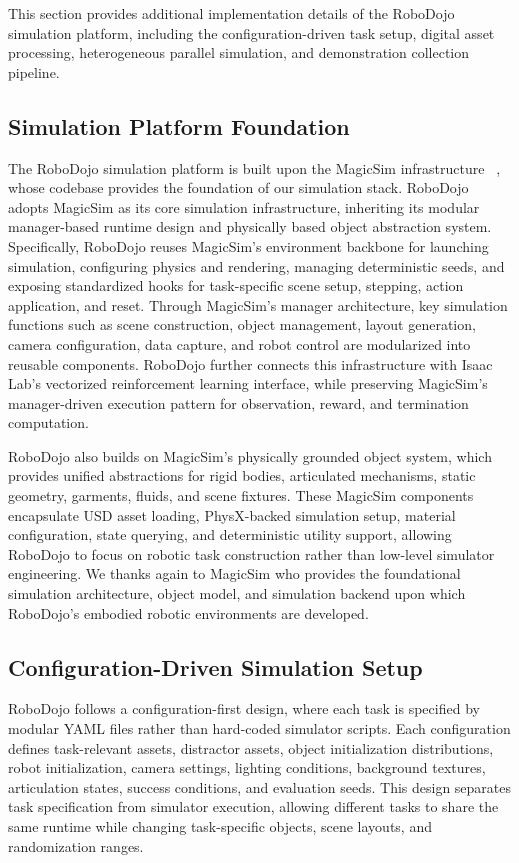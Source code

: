 This section provides additional implementation details of the RoboDojo simulation platform, including the configuration-driven task setup, digital asset processing, heterogeneous parallel simulation, and demonstration collection pipeline.

\subsection{Simulation Platform Foundation}
\label{appendix:Simulation_Platform}
The RoboDojo simulation platform is built upon the MagicSim infrastructure ~\citep{lu2026magicsim}, whose codebase provides the foundation of our simulation stack. RoboDojo adopts MagicSim as its core simulation infrastructure, inheriting its modular manager-based runtime design and physically based object abstraction system. Specifically, RoboDojo reuses MagicSim’s environment backbone for launching simulation, configuring physics and rendering, managing deterministic seeds, and exposing standardized hooks for task-specific scene setup, stepping, action application, and reset. Through MagicSim’s manager architecture, key simulation functions such as scene construction, object management, layout generation, camera configuration, data capture, and robot control are modularized into reusable components. RoboDojo further connects this infrastructure with Isaac Lab’s vectorized reinforcement learning interface, while preserving MagicSim’s manager-driven execution pattern for observation, reward, and termination computation.

RoboDojo also builds on MagicSim’s physically grounded object system, which provides unified abstractions for rigid bodies, articulated mechanisms, static geometry, garments, fluids, and scene fixtures. These MagicSim components encapsulate USD asset loading, PhysX-backed simulation setup, material configuration, state querying, and deterministic utility support, allowing RoboDojo to focus on robotic task construction rather than low-level simulator engineering. We thanks again to MagicSim who provides the foundational simulation architecture, object model, and simulation backend upon which RoboDojo’s embodied robotic environments are developed.


\subsection{Configuration-Driven Simulation Setup}
\label{appendix:simulation_platform_setup}

RoboDojo follows a configuration-first design, where each task is specified by modular YAML files rather than hard-coded simulator scripts. Each configuration defines task-relevant assets, distractor assets, object initialization distributions, robot initialization, camera settings, lighting conditions, background textures, articulation states, success conditions, and evaluation seeds. This design separates task specification from simulator execution, allowing different tasks to share the same runtime while changing task-specific objects, scene layouts, and randomization ranges.

